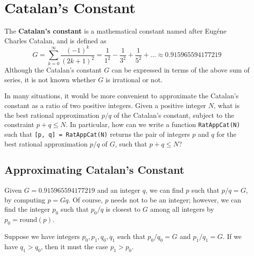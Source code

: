 
\section{Catalan's Constant}

\begin{definition}
	The \textbf{Catalan's constant} is a mathematical constant named after Eug\'ene Charles Catalan, and is defined as
	$$G = \sum_{k=0}^\infty \frac{(-1)^k}{(2k+1)^2} = \frac{1}{1^2} - \frac{1}{3^2} + \frac{1}{5^2} + \dots \approx 0.915965594177219$$
	Although the Catalan's constant $G$ can be expressed in terms of the above sum of series, it is not known whether $G$ is irrational or not.
\end{definition}

\begin{problem}
	In many situations, it would be more convenient to approximate the Catalan's constant as a ratio of two positive integers. Given a positive integer $N$, what is the best rational approximation $p / q$ of the Catalan's constant, subject to the constraint $p + q \leq N$. In particular, how can we write a function \lstinline|RatAppCat(N)| such that \lstinline|[p, q] = RatAppCat(N)| returns the pair of integers $p$ and $q$ for the best rational approximation $p / q$ of $G$, such that $p + q \leq N$?
\end{problem}


\subsection{Approximating Catalan's Constant}
\begin{observation}
	Given $G = 0.915965594177219$ and an integer $q$, we can find $p$ such that $p / q = G$, by computing $p = Gq$. Of course, $p$ needs not to be an integer; however, we can find the integer $p_0$ such that $p_0 / q$ is closest to $G$ among all integers by $p_0 = \text{round}(p)$.
\end{observation}

\begin{claim}
	Suppose we have integers $p_0, p_1, q_0, q_1$ such that $p_0 / q_0 = G$ and $p_1 / q_1 = G$. If we have $q_1 > q_0$, then it must the case $p_1 > p_0$.
\end{claim}

